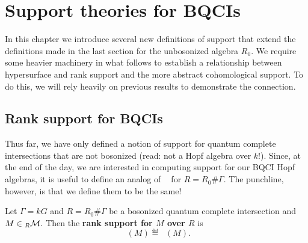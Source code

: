 \documentclass [11pt, proquest] {uwthesis}[2020/02/24]
\DeclareMathOperator{\suppr}{supp^\mathit{rnk}}
\DeclareMathOperator{\supprR}{supp^\mathit{rnk}_R}
\DeclareMathOperator{\supprRnaught}{supp^\mathit{rnk}_{R_0}}
\begin{document}
\chapter{Support theories for BQCIs}\label{chp:var-qbci}
In this chapter we introduce several new definitions of support that extend the definitions made in the last section for the unbosonized algebra $R_0$. We require some heavier machinery in what follows to establish a relationship between hypersurface and rank support and the more abstract cohomological support. To do this, we will rely heavily on previous results to demonstrate the connection.

\section{Rank support for BQCIs}
    Thus far, we have only defined a notion of support for quantum complete intersections that are not bosonized (read: not a Hopf algebra over $k$!). Since, at the end of the day, we are interested in computing support for our BQCI Hopf algebras, it is useful to define an analog of $\suppr$ for $R=R_0\#\Gamma$. The punchline, however, is that we define them to be the same!
    
    \begin{defn}\label{def:bosonized-rank-supp}
        Let $\Gamma=kG$ and $R=R_0\#\Gamma$ be a bosonized quantum complete intersection and $M\in{_R\mathcal{M}}.$ Then the \textbf{rank support for $M$ over $R$} is
        \[\supprR(M)\eqdef\supprRnaught(M).\]
    \end{defn}
    
    
    
        
\end{document}
